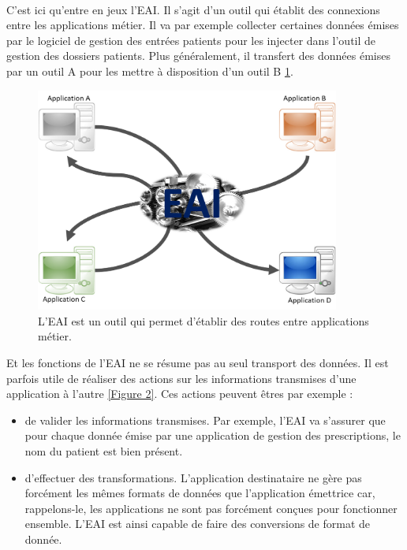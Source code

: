 			\paragraph{}%
			C'est ici qu'entre en jeux l'EAI. Il s'agit d'un outil qui établit des
			connexions entre les applications métier. Il va par exemple collecter
			certaines données émises par le logiciel de gestion des entrées patients
			pour les injecter dans l'outil de gestion des dossiers patients. Plus
			généralement, il transfert des données émises par un outil A pour les
			mettre à disposition d'un outil B \ref{Figure 1}.\newline
			
			\begin{figure}
				\centering
				\includegraphics[width=10cm]{../img/eai_1.png}
				\caption{\label{Figure 1} L'EAI est un outil qui permet d'établir des
				routes entre applications métier.}
			\end{figure}
			
			Et les fonctions de l'EAI ne se résume pas au seul transport des données. Il
			est parfois utile de réaliser des actions sur les informations transmises
			d'une application à l'autre \ref{Figure 2}. Ces actions peuvent êtres par
			exemple :\newline
			\begin{itemize}
			  \item de valider les informations transmises. Par exemple, l'EAI va
			  s'assurer que pour chaque donnée émise par une application de gestion des
			  prescriptions, le nom du patient est bien présent.
			  \item d'effectuer des transformations. L'application destinataire ne
			  gère pas forcément les mêmes formats de données que l'application émettrice
			  car, rappelons-le, les applications ne sont pas forcément conçues pour
			  fonctionner ensemble. L'EAI est ainsi capable de faire des conversions de
			  format de donnée.
			\end{itemize}

